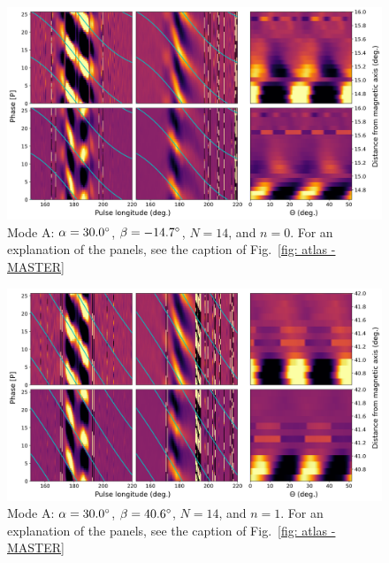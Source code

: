 \begin{figure}
	\begin{center}
		\includegraphics[width=\atlasHeightFrac\textwidth]{Figures/B0031/atlas/A_517030014000_plots}
		\caption[Atlas results: Mode A -- $\alpha=30.0\degr$, $\beta=-14.7\degr$, $N=14$, $n=0$]{Mode A: $\alpha=30.0\degr$, $\beta=-14.7\degr$, $N=14$, and $n=0$. For an explanation of the panels, see the caption of Fig.~\ref{fig: atlas - MASTER} }
		\label{fig: atlas - A_517030014000}
	\end{center}
\end{figure}

\begin{figure}
	\begin{center}
		\includegraphics[width=\atlasHeightFrac\textwidth]{Figures/B0031/atlas/A_517030014001_plots}
		\caption[Atlas results: Mode A -- $\alpha=30.0\degr$, $\beta=40.6\degr$, $N=14$, $n=1$]{Mode A: $\alpha=30.0\degr$, $\beta=40.6\degr$, $N=14$, and $n=1$. For an explanation of the panels, see the caption of Fig.~\ref{fig: atlas - MASTER} }
		\label{fig: atlas - A_517030014001}
	\end{center}
\end{figure}

